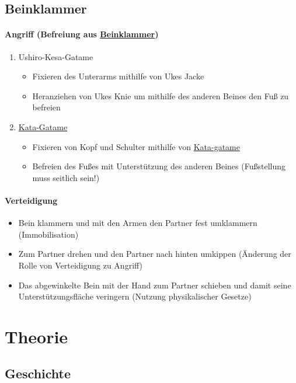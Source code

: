 \documentclass[justified, a4paper, notitlepage, captions=tableheading, nobib]{tufte-handout}
\begin{document}
\subsection{\label{org2aa82f8}Beinklammer }
\label{sec:orgd8a3fcb}
\paragraph{Angriff (Befreiung aus \hyperref[org2aa82f8]{Beinklammer})}
\label{sec:orgcb0a2b4}
\begin{enumerate}
\item Ushiro-Kesa-Gatame
\begin{itemize}
\item Fixieren des Unterarms mithilfe von Ukes Jacke
\item Heranziehen von Ukes Knie um mithilfe des anderen Beines den Fuß zu befreien
\end{itemize}
\item \hyperref[org52b0dc1]{Kata-Gatame}
\begin{itemize}
\item Fixieren von Kopf und Schulter mithilfe von \hyperref[org52b0dc1]{Kata-gatame}
\item Befreien des Fußes mit Unterstützung des anderen Beines (Fußstellung muss seitlich sein!)
\end{itemize}
\end{enumerate}

\paragraph{Verteidigung}
\label{sec:org29905e8}
\begin{itemize}
\item Bein klammern und mit den Armen den Partner fest umklammern (Immobilisation)
\item Zum Partner drehen und den Partner nach hinten umkippen (Änderung der Rolle von Verteidigung zu Angriff)
\item Das abgewinkelte Bein mit der Hand zum Partner schieben und damit seine Unterstützungsfläche veringern (Nutzung physikalischer Gesetze)
\end{itemize}

\newpage
\section{Theorie }
\label{sec:org9ee7e3e}
\subsection{Geschichte}
\label{sec:orgcd6065a}
\end{document}
